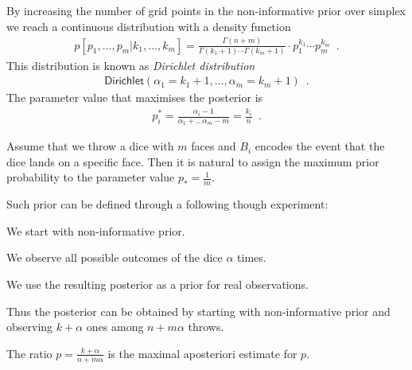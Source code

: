 \documentclass[landscape,footrule]{foils}
\begin{document}

By increasing the number of grid points in the non-informative prior over simplex we reach a continuous distribution with a density function
\begin{align*}  
p[p_1,\ldots, p_m|k_1,\ldots, k_m] = \frac{\Gamma(n+m)}{\Gamma(k_1+1)\cdots\Gamma(k_m+1)}\cdot p_1^{k_1}\cdots p_m^{k_m}\enspace.
\end{align*}
This distribution is known as \emph{Dirichlet  distribution}
\begin{align*}
 \mathsf{Dirichlet}(\alpha_1=k_1+1,\ldots, \alpha_m=k_m+1)\enspace.
\end{align*} 
The parameter value that maximises the posterior is 
\begin{align*}
p_i^* =\frac{\alpha_i-1}{\alpha_1+\ldots\alpha_m-m}=\frac{k_i}{n}\enspace.
\end{align*} 



Assume that we throw a dice with $m$ faces and $B_i$ encodes the event that the dice lands on a specific face. Then it is natural to assign the maximum prior probability to the parameter value $p_*=\frac{1}{m}$.
\vspace*{1cm}

Such prior can be defined through a following though experiment:
\begin{triangles}
\item We start with non-informative prior.
\item We observe all possible outcomes of the dice $\alpha$ times.
\item We use the resulting posterior as a prior for real observations. 
\end{triangles}
\vspace*{1cm}

Thus the posterior can be obtained by starting with non-informative prior and observing $k+\alpha$ ones among $n + m\alpha$ throws.  
\begin{triangles}
\item The ratio $p=\frac{k+\alpha}{n+m\alpha}$ is the maximal aposteriori estimate for $p$.
\end{triangles}




\end{document}
